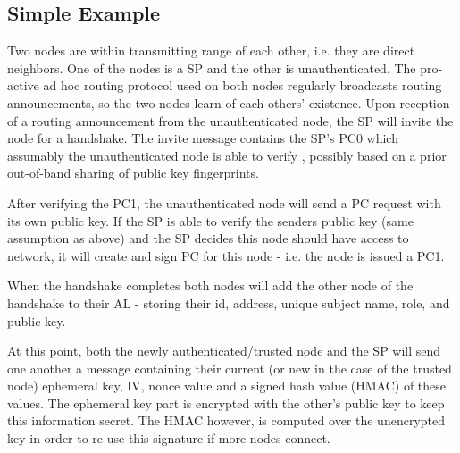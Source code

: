 \subsection{Simple Example}
Two nodes are within transmitting range of each other, i.e. they are direct
neighbors. One of the nodes is a \ac{SP} and the other is unauthenticated. The
pro-active ad hoc routing protocol used on both nodes regularly broadcasts
routing announcements, so the two nodes learn of each others' existence. Upon
reception of a routing announcement from the unauthenticated node, the \ac{SP}
will invite the node for a handshake. The invite message contains the \ac{SP}'s
\ac{PC0} which assumably the unauthenticated node is able to verify , possibly
based on a prior out-of-band sharing of public key fingerprints.

After verifying the \ac{PC1}, the unauthenticated node will send a \ac{PC}
request with its own public key. If the \ac{SP} is able to verify the senders
public key (same assumption as above) and the \ac{SP} decides this node should
have access to network, it will create and sign \ac{PC} for this node - i.e. the
node is issued a \ac{PC1}.



When the handshake completes both nodes will add the other node of the handshake
to their \ac{AL} - storing their id, address, unique subject name, role, and
public key.

At this point, both the newly authenticated/trusted node and the \ac{SP} will
send one another a message containing their current (or new in the case of the
trusted node) ephemeral key, \ac{IV}, nonce value and a signed hash value (HMAC) of
these values. The ephemeral key part is encrypted with the other's public key to
keep this information secret. The HMAC however, is computed over the unencrypted
key in order to re-use this signature if more nodes connect.

